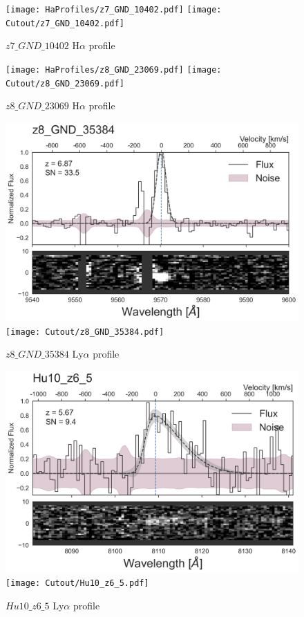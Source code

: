 \documentclass[12pt,english]{article}
\begin{document}
\clearpage
\begin{figure}
\begin{center}\texttt{[image: HaProfiles/z7\_GND\_10402.pdf]}
\texttt{[image: Cutout/z7\_GND\_10402.pdf]}
\caption{$z7\_GND\_10402$ H$\alpha$ profile}
\end{center}
\end{figure}
\clearpage
\begin{figure}
\begin{center}\texttt{[image: HaProfiles/z8\_GND\_23069.pdf]}
\texttt{[image: Cutout/z8\_GND\_23069.pdf]}
\caption{$z8\_GND\_23069$ H$\alpha$ profile}
\end{center}
\end{figure}
\clearpage
\begin{figure}
\begin{center}\includegraphics[width=12cm, trim=0.1cm 0cm 0cm -1cm]{LyaProfiles/z8_GND_35384.png}
\texttt{[image: Cutout/z8\_GND\_35384.pdf]}
\caption{$z8\_GND\_35384$ Ly$\alpha$ profile}
\end{center}
\end{figure}
\clearpage
\begin{figure}
\begin{center}\includegraphics[width=12cm, trim=0.1cm 0cm 0cm -1cm]{LyaProfiles/Hu10_z6_5.png}
\texttt{[image: Cutout/Hu10\_z6\_5.pdf]}
\caption{$Hu10\_z6\_5$ Ly$\alpha$ profile}
\end{center}
\end{figure}
\end{document}
